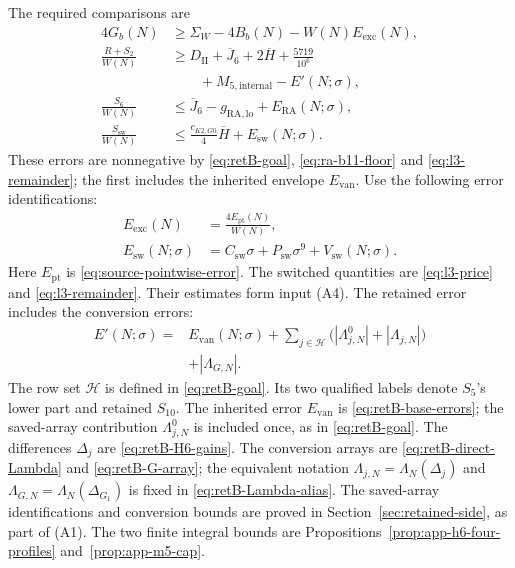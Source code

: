 The required comparisons are
\begin{equation}\label{eq:intro-comparisons}
\begin{aligned}
 4G_b(N)&\ge\Sigma_W-4B_b(N)-W(N)E_{\mathrm{exc}}(N),\\
 \frac{R+S_2}{W(N)}&\ge D_{\mathrm{II}}+\overline J_6
          +2\overline H+\frac{5719}{10^6}\\
 &\qquad+M_{5,\mathrm{internal}}-E'(N;\sigma),\\
 \frac{S_6}{W(N)}&\le\overline J_6-g_{\mathrm{RA,lo}}
                                  +E_{\mathrm{RA}}(N;\sigma),\\
 \frac{S_{\mathrm{sw}}}{W(N)}&\le
           \frac{c_{K2,G0}}4\overline H
                                  +E_{\mathrm{sw}}(N;\sigma).
\end{aligned}
\end{equation}
These errors are nonnegative by \eqref{eq:retB-goal},
\eqref{eq:ra-b11-floor} and \eqref{eq:l3-remainder}; the first includes the
inherited envelope $E_{\mathrm{van}}$.
Use the following error identifications:
\begin{equation}\label{eq:intro-error-identifications}
\begin{aligned}
 E_{\mathrm{exc}}(N)&=\frac{4E_{\mathrm{pt}}(N)}{W(N)},\\
 E_{\mathrm{sw}}(N;\sigma)&=C_{\mathrm{sw}}\sigma
                     +P_{\mathrm{sw}}\sigma^9+V_{\mathrm{sw}}(N;\sigma).
\end{aligned}
\end{equation}
Here $E_{\mathrm{pt}}$ is \eqref{eq:source-pointwise-error}.
The switched quantities are \eqref{eq:l3-price} and \eqref{eq:l3-remainder}.
Their estimates form input \textup{(A4)}.
The retained error includes the conversion errors:
\begin{equation}\label{eq:intro-retained-error}
\begin{aligned}
 E'(N;\sigma)={}&E_{\mathrm{van}}(N;\sigma)
 +\sum_{j\in\mathcal H}\bigl(|\Lambda^0_{j,N}|+|\Lambda_{j,N}|\bigr)\\
 &+|\Lambda_{G,N}|.
\end{aligned}
\end{equation}
The row set $\mathcal H$ is defined in \eqref{eq:retB-goal}.
Its two qualified labels denote $S_5$'s lower part and retained $S_{10}$.
The inherited error $E_{\mathrm{van}}$ is \eqref{eq:retB-base-errors};
the saved-array contribution $\Lambda^0_{j,N}$ is included once,
as in \eqref{eq:retB-goal}.
The differences $\Delta_j$ are \eqref{eq:retB-H6-gains}.
The conversion arrays are \eqref{eq:retB-direct-Lambda}
and \eqref{eq:retB-G-array}; the equivalent notation
$\Lambda_{j,N}=\Lambda_N(\Delta_j)$ and
$\Lambda_{G,N}=\Lambda_N(\Delta_{G_1})$ is fixed in
\eqref{eq:retB-Lambda-alias}.
The saved-array identifications and conversion bounds are proved in
Section~\ref{sec:retained-side}, as part of \textup{(A1)}.
The two finite integral bounds are
Propositions~\ref{prop:app-h6-four-profiles} and~\ref{prop:app-m5-cap}.

